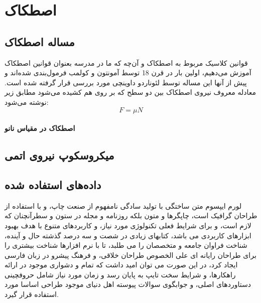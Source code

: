 \chapter{اصطکاک}
\label{friction}
\thispagestyle{empty}
\noindent
\vskip 2cm



\section{مساله اصطکاک}

قوانین کلاسیک مربوط به اصطکاک و آن‌چه که ما در مدرسه بعنوان قوانین اصطکاک آموزش می‌دهیم، اولین بار در قرن 18  توسط آمونتون و کولمب فرمول‌بندی شده‌اند و پیش از آنها این مساله توسط لئوناردو داوینچی مورد بررسی قرار گرفته شده است. معادله معروف نیروی اصطکاک بین دو سطح که بر روی هم کشیده می‌شود مطابق زیر نوشته می‌شود: 
\begin{equation}\label{eq:frq}
	F= \mu N
\end{equation}

\subsubsection*{اصطکاک در مقیاس نانو}

\section{میکروسکوپ نیروی اتمی}

\section{داده‌های استفاده شده}
لورم ایپسوم متن ساختگی با تولید سادگی نامفهوم از صنعت چاپ، و با استفاده از طراحان گرافیک است، چاپگرها و متون بلکه روزنامه و مجله در ستون و سطرآنچنان که لازم است، و برای شرایط فعلی تکنولوژی مورد نیاز، و کاربردهای متنوع با هدف بهبود ابزارهای کاربردی می باشد، کتابهای زیادی در شصت و سه درصد گذشته حال و آینده، شناخت فراوان جامعه و متخصصان را می طلبد، تا با نرم افزارها شناخت بیشتری را برای طراحان رایانه ای علی الخصوص طراحان خلاقی، و فرهنگ پیشرو در زبان فارسی ایجاد کرد، در این صورت می توان امید داشت که تمام و دشواری موجود در ارائه راهکارها، و شرایط سخت تایپ به پایان رسد و زمان مورد نیاز شامل حروفچینی دستاوردهای اصلی، و جوابگوی سوالات پیوسته اهل دنیای موجود طراحی اساسا مورد استفاده قرار گیرد.

